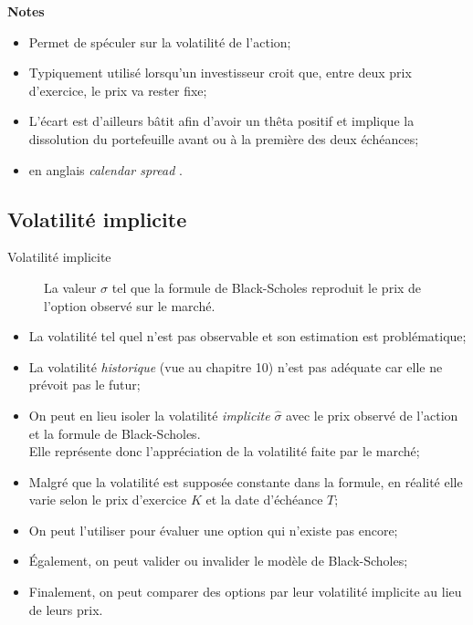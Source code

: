 \documentclass[10pt, french]{article}
\begin{document}
\begin{multicols*}{2}
\begin{definitionNOHFILL}
\tcbline
\textbf{Notes}
\begin{itemize}[leftmargin = *]
	\item	Permet de spéculer sur la volatilité de l'action;
	\item	Typiquement utilisé lorsqu'un investisseur croit que, entre deux prix d'exercice, le prix va rester fixe;
	\item	L'écart est d'ailleurs bâtit afin d'avoir un thêta positif et implique la dissolution du portefeuille avant ou à la première des deux échéances;
	\item	en anglais \og \textit{calendar spread} \fg{}.
\end{itemize}
\end{definitionNOHFILL}

\subsection{Volatilité implicite}
\begin{description}
	\item[Volatilité implicite]	La valeur $\sigma$ tel que la formule de Black-Scholes reproduit le prix de l’option observé sur le marché.
\end{description}
\begin{itemize}[leftmargin = *]
	\item	La volatilité tel quel n'est pas observable et son estimation est problématique;
	\item	La volatilité \textit{historique} (vue au chapitre 10) n'est pas adéquate car elle ne prévoit pas le futur;
	\item	On peut en lieu isoler la volatilité \textit{implicite} $\hat{\sigma}$ avec le prix observé de l'action et la formule de Black-Scholes.	\\
			Elle représente donc l'appréciation de la volatilité faite par le marché;
	\item	Malgré que la volatilité est supposée constante dans la formule, en réalité elle varie selon le prix d'exercice $K$ et la date d'échéance $T$;
	\item	On peut l'utiliser pour évaluer une option qui n'existe pas encore;
	\item	Également, on peut valider ou invalider le modèle de Black-Scholes;
	\item	Finalement, on peut comparer des options par leur volatilité implicite au lieu de leurs prix.
\end{itemize}


\end{multicols*}
\end{document}
